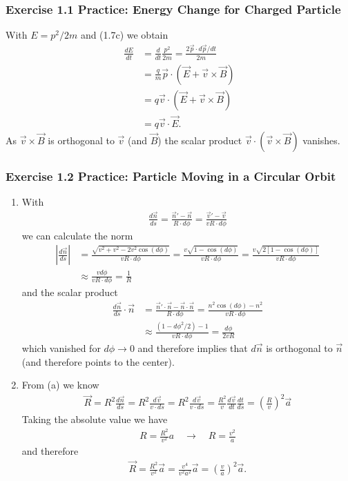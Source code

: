 \documentclass[10pt,a4paper]{article}
\theoremstyle{definition}
\begin{document}
\subsubsection{Exercise 1.1 Practice: Energy Change for Charged Particle}
With $E=p^2/2m$ and (1.7c) we obtain
\begin{align}
    \frac{dE}{dt}&=\frac{d}{dt}\frac{p^2}{2m}=\frac{2 \vec{p}\cdot d\vec{p}/dt}{2m}\\
    &=\frac{q}{m}\vec{p}\cdot (\vec{E}+\vec{v}\times\vec{B})\\
    &=q\vec{v}\cdot (\vec{E}+\vec{v}\times\vec{B})\\
    &=q\vec{v}\cdot\vec{E}.
\end{align}
As $\vec{v}\times\vec{B}$ is orthogonal to $\vec{v}$ (and $\vec{B}$) the scalar product $\vec{v}\cdot(\vec{v}\times\vec{B})$ vanishes.

\subsubsection{Exercise 1.2 Practice: Particle Moving in a Circular Orbit}
\begin{enumerate}[label=(\alph*)]
\item With
\begin{align}
    \frac{d\vec{n}}{ds}
    =\frac{\vec{n}'-\vec{n}}{R\cdot d\phi}=\frac{\vec{v}'-\vec{v}}{vR\cdot d\phi}
\end{align}
we can calculate the norm
\begin{align}
    \left|\frac{d\vec{n}}{ds}\right|
    &=\frac{\sqrt{v^2+v^2-2v^2\cos(d\phi)}}{vR\cdot d\phi}
    =\frac{v\sqrt{1-\cos(d\phi)}}{vR\cdot d\phi}
    = \frac{v\sqrt{2[1-\cos(d\phi)]}}{vR\cdot d\phi}\\
    &\approx\frac{vd\phi}{vR\cdot d\phi}=\frac{1}{R}
\end{align}
and the scalar product
\begin{align}
    \frac{d\vec{n}}{ds}\cdot\vec{n}
    &=\frac{\vec{n}'\cdot\vec{n}-\vec{n}\cdot\vec{n}}{R\cdot d\phi}=\frac{n^2\cos(d\phi)-n^2}{vR\cdot d\phi}\\
    &\approx \frac{(1-d\phi^2/2)-1}{vR\cdot d\phi}=\frac{d\phi}{2vR}
\end{align}
which vanished for $d\phi\rightarrow0$ and therefore implies that $d\vec{n}$ is orthogonal to $\vec{n}$ (and therefore points to the center).
\item From (a) we know
\begin{align}
    \vec{R}=R^2\frac{d\vec{n}}{ds}
    =R^2\frac{d\vec{v}}{v\cdot ds}
    =R^2\frac{d\vec{v}}{v\cdot ds}
    =\frac{R^2}{v}\frac{d\vec{v}}{dt}\frac{dt}{ds}
    =\left(\frac{R}{v}\right)^2\vec{a}
\end{align}
Taking the absolute value we have
\begin{align}
    R=\frac{R^2}{v^2}a\quad\rightarrow\quad R=\frac{v^2}{a}
\end{align}
and therefore
\begin{align}
    \vec{R}=\frac{R^2}{v^2}\vec{a}=\frac{v^4}{v^2 a^2}\vec{a}=\left(\frac{v}{a}\right)^2\vec{a}.
\end{align}
\end{enumerate}
\end{document}
